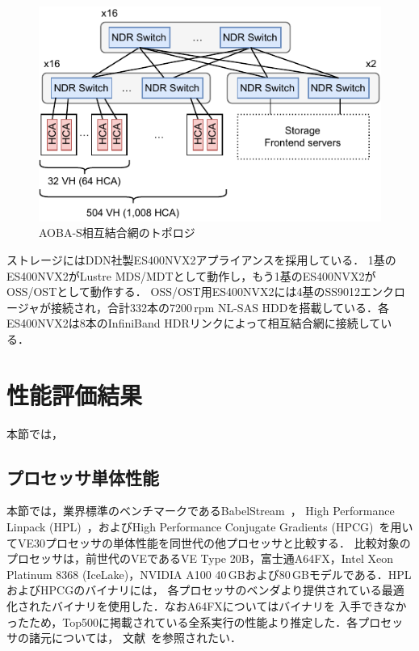 ﻿\documentclass[submit,techrep,noauthor]{ipsj}
\begin{document}
\begin{figure}
  \centering
  \includegraphics{figs/nw_topology.pdf}
  \caption{AOBA-S相互結合網のトポロジ}\label{fig:topo}
\end{figure}

ストレージにはDDN社製ES400NVX2アプライアンスを採用している．
1基のES400NVX2がLustre MDS/MDTとして動作し，もう1基のES400NVX2がOSS/OSTとして動作する．
OSS/OST用ES400NVX2には4基のSS9012エンクロージャが接続され，合計332本の7200\,rpm NL-SAS
HDDを搭載している．各ES400NVX2は8本のInfiniBand HDRリンクによって相互結合網に接続している．

\section{性能評価結果}

本節では，

\subsection{プロセッサ単体性能}

本節では，業界標準のベンチマークであるBabelStream~\cite{Deakin2018}，
High Performance Linpack (HPL)~\cite{Dongarra2003}，およびHigh Performance Conjugate
Gradients (HPCG)~\cite{Dongarra2016}を用いてVE30プロセッサの単体性能を同世代の他プロセッサと比較する．
比較対象のプロセッサは，前世代のVEであるVE Type 20B，富士通A64FX，Intel Xeon Platinum 8368
(IceLake)，NVIDIA A100 40\,GBおよび80\,GBモデルである．HPLおよびHPCGのバイナリには，
各プロセッサのベンダより提供されている最適化されたバイナリを使用した．なおA64FXについてはバイナリを
入手できなかったため，Top500に掲載されている全系実行の性能より推定した．各プロセッサの諸元については，
文献~\cite{Takahashi2023}を参照されたい．
\end{document}
